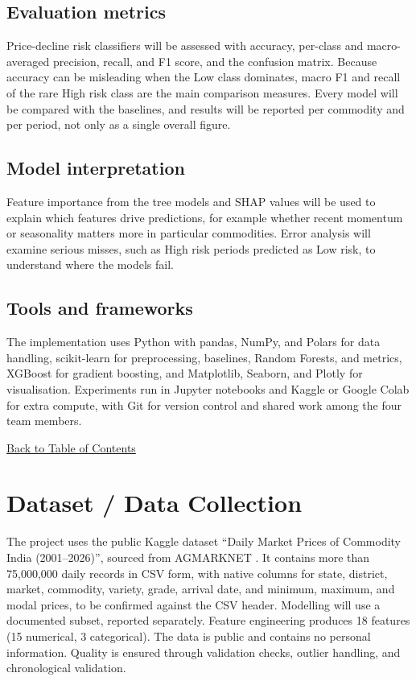 \documentclass[12pt,a4paper]{article}
\begin{document}
\subsection{Evaluation metrics}
Price-decline risk classifiers will be assessed with accuracy, per-class and macro-averaged precision, recall, and F1 score, and the confusion matrix. Because accuracy can be misleading when the Low class dominates, macro F1 and recall of the rare High risk class are the main comparison measures. Every model will be compared with the baselines, and results will be reported per commodity and per period, not only as a single overall figure.

\subsection{Model interpretation}
Feature importance from the tree models and SHAP values \cite{lundberg2017unified} will be used to explain which features drive predictions, for example whether recent momentum or seasonality matters more in particular commodities. Error analysis will examine serious misses, such as High risk periods predicted as Low risk, to understand where the models fail.

\subsection{Tools and frameworks}
The implementation uses Python with pandas, NumPy, and Polars for data handling, scikit-learn \cite{pedregosa2011scikit} for preprocessing, baselines, Random Forests, and metrics, XGBoost for gradient boosting, and Matplotlib, Seaborn, and Plotly for visualisation. Experiments run in Jupyter notebooks and Kaggle or Google Colab for extra compute, with Git for version control and shared work among the four team members.

\hyperref[contents]{\small Back to Table of Contents}

\newpage
\section{Dataset / Data Collection}
The project uses the public Kaggle dataset ``Daily Market Prices of Commodity India (2001--2026)'', sourced from AGMARKNET \cite{khandelwal2026daily}. It contains more than 75,000,000 daily records in CSV form, with native columns for state, district, market, commodity, variety, grade, arrival date, and minimum, maximum, and modal prices, to be confirmed against the CSV header. Modelling will use a documented subset, reported separately. Feature engineering produces 18 features (15 numerical, 3 categorical). The data is public and contains no personal information. Quality is ensured through validation checks, outlier handling, and chronological validation.
\end{document}
